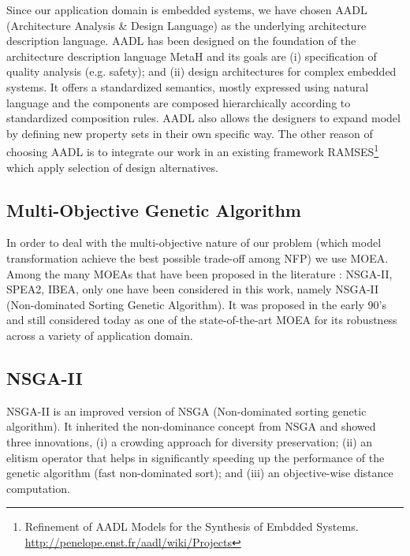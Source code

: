 \documentclass[conference]{IEEEtran}
\begin{document}
Since our application domain is embedded systems, we have chosen AADL (Architecture Analysis \& Design Language) as the underlying architecture description language. AADL has been designed on the foundation of the architecture description language MetaH and its goals are (i) specification of quality analysis (e.g. safety); and (ii) design architectures for complex embedded systems. It offers a standardized semantics, mostly expressed using natural language and the components are composed hierarchically according to standardized composition rules. AADL also allows the designers to expand model by defining new property sets in their own specific way. The other reason of choosing AADL is to integrate our work in an existing framework RAMSES\footnote{Refinement of AADL Models for the Synthesis of Embdded Systems. \url{http://penelope.enst.fr/aadl/wiki/Projects}} which apply selection of design alternatives.

\subsection{Multi-Objective Genetic Algorithm}
In order to deal with the multi-objective nature of our problem (which model transformation achieve the best possible trade-off among NFP) we use MOEA. 
Among the many MOEAs that have been proposed in the literature : NSGA-II\cite{Deb:2002:FEM:2221359.2221582}, SPEA2\cite{Zitzler01spea2:improving}, IBEA\cite{Zitzler04indicatorbasedselection}, only one have been considered in this work, namely NSGA-II (Non-dominated Sorting Genetic Algorithm). It was proposed in the early 90's and still considered today as one of the state-of-the-art MOEA for its robustness across a variety of application domain.

\subsection{NSGA-II}
NSGA-II is an improved version of NSGA\cite{Srinivas94multiobjectiveoptimization} (Non-dominated sorting genetic algorithm). It inherited the non-dominance concept from NSGA and showed three innovations, (i) a crowding approach for diversity preservation; (ii) an elitism operator that helps in significantly speeding up the performance of the genetic algorithm (fast non-dominated sort); and (iii) an objective-wise distance computation. 
\end{document}
